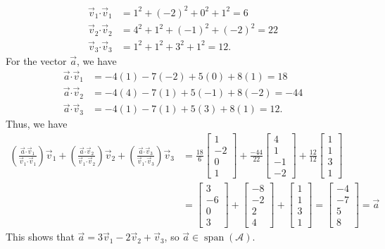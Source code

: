 \documentclass[letterpaper,12pt]{article}
\newcommand{\dotp}{\boldsymbol{\cdot}}
\newcommand{\bbm}{\begin{bmatrix}}
\newcommand{\ebm}{\end{bmatrix}}
\begin{document}
\begin{enumerate}
\begin{enumerate}
\begin{align*}
 \vec{v}_1\dotp \vec{v}_1 & = 1^2+(-2)^2+0^2+1^2 = 6\\
 \vec{v}_2\dotp \vec{v}_2 & = 4^2+1^2+(-1)^2+(-2)^2 = 22\\
 \vec{v}_3\dotp \vec{v}_3 & = 1^2+1^2+3^2+1^2 = 12.
\end{align*}
For the vector $\vec{a}$, we have
\begin{align*}
 \vec{a}\dotp \vec{v}_1 & = -4(1)-7(-2)+5(0)+8(1) = 18\\
 \vec{a}\dotp \vec{v}_2 & = -4(4)-7(1)+5(-1)+8(-2) = -44\\
 \vec{a}\dotp \vec{v}_3 & = -4(1)-7(1)+5(3)+8(1) = 12.
\end{align*}
Thus, we have
\begin{align*}
 \left(\frac{\vec{a}\dotp \vec{v}_1}{\vec{v}_1\dotp\vec{v}_1}\right)\vec{v}_1+
 \left(\frac{\vec{a}\dotp \vec{v}_2}{\vec{v}_1\dotp\vec{v}_2}\right)\vec{v}_2+
 \left(\frac{\vec{a}\dotp \vec{v}_3}{\vec{v}_1\dotp\vec{v}_3}\right)\vec{v}_3 & = \frac{18}{6}\bbm 1\\-2\\0\\1\ebm + \frac{-44}{22}\bbm 4\\1\\-1\\-2\ebm + \frac{12}{12}\bbm 1\\1\\3\\1\ebm\\
 & = \bbm 3\\-6\\0\\3\ebm + \bbm -8\\-2\\2\\4\ebm + \bbm 1\\1\\3\\1\ebm = \bbm -4\\-7\\5\\8\ebm = \vec{a}
\end{align*}
This shows that $\vec{a} = 3\vec{v}_1-2\vec{v}_2+\vec{v}_3$, so $\vec{a}\in \operatorname{span}(\mathcal{A})$.

\medskip


\end{enumerate}
\end{enumerate}
\end{document}
